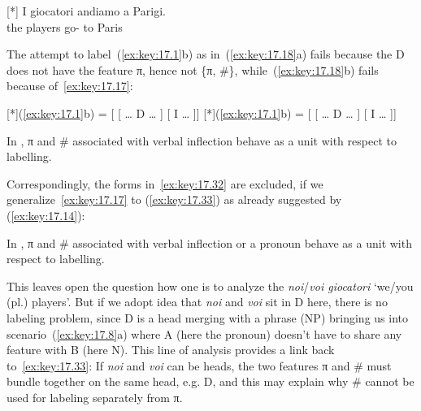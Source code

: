 \documentclass[output=paper]{langsci/langscibook}
\begin{document}
\begin{exe}
    \exi{\eqref{ex:key:17.1}}
    \begin{xlist}
    [*]{%
    \gll I giocatori andiamo a Parigi.\\
    the players go-\Fpl{} to Paris\\
    \glt}
    \end{xlist}
\end{exe}
The attempt to label~(\ref{ex:key:17.1}b) as in~(\ref{ex:key:17.18}a) fails because
the D does not have the feature π, hence not \{π, \#\},
while~(\ref{ex:key:17.18}b) fails because of~\eqref{ex:key:17.17}:

\begin{exe}
\exi{\eqref{ex:key:17.18}}
\begin{xlist}
    [*]{(\ref{ex:key:17.1}b) = [\tss{\{} [ \dots{} D\tss{\#} \dots{} ] [ I\tss{\{}\tss{,\#\}} \dots{} ]]}
    [*]{(\ref{ex:key:17.1}b)  = [ [ \dots{} D\tss{\#} \dots{} ] [ I\tss{\{}\tss{,\#\}} \dots{} ]]}
\end{xlist}
\end{exe}

\begin{exe}
\exi{\eqref{ex:key:17.17}}
    In , π and \# associated with verbal inflection behave as a unit
    with respect to labelling.
\end{exe}
Correspondingly, the forms in~\eqref{ex:key:17.32} are excluded, if we
generalize~\eqref{ex:key:17.17} to (\ref{ex:key:17.33}) as already suggested by
(\ref{ex:key:17.14}):

\ea\label{ex:key:17.33}
    In , π and \# associated with verbal inflection or a pronoun behave
    as a unit with respect to labelling.
\z

\ea\label{ex:key:17.34}
    \z
\z
This leaves open the question how one is to analyze the 
\emph{noi}/\emph{voi giocatori} ‘we/you (pl.) players’. But if we adopt
 idea that \emph{noi} and \emph{voi} sit in D here, there is
no labeling problem, since D is a head merging with a phrase (NP) bringing us
into scenario~(\ref{ex:key:17.8}a) where A (here the pronoun) doesn’t have to
share any feature with B (here N). This line of analysis provides a link back
to~\eqref{ex:key:17.33}: If \emph{noi} and \emph{voi} can be heads, the two
features π and \# must bundle together on the same head, e.g. D, and this may
explain why \# cannot be used for labeling separately from π.
\end{document}
